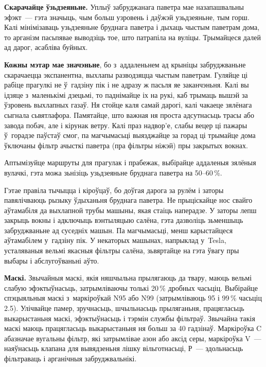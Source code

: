 \textbf{Скарачайце ўзьдзеяньне.} Уплыў забруджанага паветра мае назапашвальны эфэкт~--- гэта значыць, чым больш узровень і даўжэй узьдзеяньне, тым горш. Калі мінімізаваць узьдзеяньне бруднага паветра і дыхаць чыстым паветрам дома, то арганізм пасьпявае выводзіць тое, што патрапіла на вуліцы. Трымайцеся далей ад дарог, асабліва буйных.

\textbf{Кожны мэтар мае значэньне}, бо з~аддаленьнем ад крыніцы забруджваньне скарачаецца экспанентна, выхлапы разводзяцца чыстым паветрам. Гуляйце ці рабіце прагулкі не ў~гадзіну пік і не адразу ж пасьля яе заканчэньня. Калі вы ідзяце з~маленькімі дзецьмі, то паднімайце іх на рукі, каб трымаць вышэй за ўзровень выхлапных газаў. Ня стойце каля самай дарогі, калі чакаеце зялёнага сыгнала сьвятлафора. Памятайце, што важная ня проста адсутнасьць трасы або завода побач, але і кірунак ветру. Калі праз надвор'е, слабы вецер ці пажары ў~горадзе паўстаў смог, па магчымасьці выязджайце за горад ці трымайце дома ўключаны фільтр ачысткі паветра (пра фільтры ніжэй) пры закрытых вокнах.

Аптымізуйце маршруты для прагулак і прабежак, выбірайце аддаленыя зялёныя вулачкі, гэта можа зьнізіць узьдзеяньне бруднага паветра на 50--60\,\%.


Гэтае правіла тычыцца і кіроўцаў, бо доўгая дарога за рулём і заторы павялічваюць рызыку ўдыханьня бруднага паветра. Не прыціскайце нос свайго аўтамабіля да выхлапной трубы машыны, якая стаіць наперадзе. У заторы лепш закрыць вокны і адключыць вэнтыляцыю салёна, гэта дазволіць зьменшыць забруджваньне ад суседніх машын. Па магчымасьці, менш карыстайцеся аўтамабілем у~гадзіну пік. У некаторых машынах, напрыклад у~Tesla, усталяваныя вельмі якасныя фільтры салёна, зьвяртайце на гэта ўвагу пры выбары і абслугоўваньні аўто.

\textbf{Маскі.} Звычайныя маскі, якія няшчыльна прылягаюць да твару, маюць вельмі слабую эфэктыўнасьць, затрымліваючы толькі 20\,\% дробных часьціц. Выбірайце спэцыяльныя маскі з~маркіроўкай N95 або N99 (затрымліваюць 95 і 99\,\% часьціц 2.5). Улічвайце памер, зручнасьць, шчыльнасьць прыляганьня, працягласьць выкарыстаньня маскі, эфэктыўнасьць і тэрмін службы фільтраў. Звычайна такія маскі маюць працягласьць выкарыстаньня ня больш за 40 гадзінаў. Маркіроўка C абазначае вугальны фільтр, які затрымлівае азон або аксід серы, маркіроўка V~--- наяўнасьць клапана для вывядзеньня лішку вільготнасьці, Р~--- здольнасьць фільтраваць і арганічныя забруджвальнікі.

